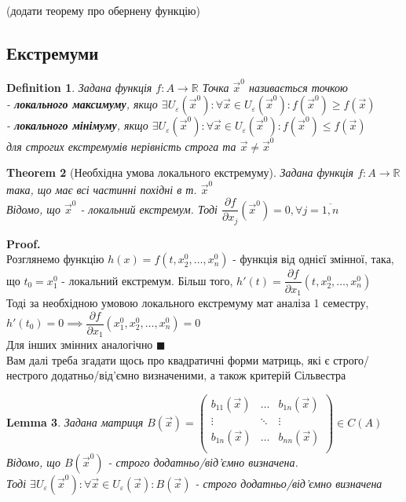 \documentclass[a4paper, 14pt]{extarticle}
\def\departial#1#2{\dfrac{\partial {#1}}{\partial {#2}}}
\def\bigline{\vspace{5mm}\\}
\theoremstyle{theoremdd}
\newtheorem{theorem}{Theorem}[subsection]
\theoremstyle{theoremdd}
\newtheorem{definition}[theorem]{Definition}
\theoremstyle{theoremdd}
\theoremstyle{theoremdd}
\theoremstyle{theoremdd}
\theoremstyle{theoremdd}
\newtheorem{lemma}[theorem]{Lemma}
\theoremstyle{theoremdd}
\newenvironment{pf}{\vspace*{-3mm} \textbf{Proof. \\}}{$\blacksquare$}
\begin{document}
(додати теорему про обернену функцію)

\subsection{Екстремуми}
\begin{definition}
Задана функція $f:A\to \mathbb{R}$
Точка $\vec{x}^0$ називається точкою\\
- \textbf{локального максимуму}, якщо $\exists U_{\varepsilon}(\vec{x}^0): \forall \vec{x} \in U_{\varepsilon}(\vec{x}^0): f(\vec{x}^0) \geq f(\vec{x})$\\
- \textbf{локального мінімуму}, якщо $\exists U_{\varepsilon}(\vec{x}^0): \forall \vec{x} \in U_{\varepsilon}(\vec{x}^0): f(\vec{x}^0) \leq f(\vec{x})$\\
для строгих екстремумів нерівність строга та $\vec{x} \neq \vec{x}^0$
\end{definition}

\begin{theorem}[Необхідна умова локального екстремуму]
Задана функція $f: A \to \mathbb{R}$ така, що має всі частинні похідні в т. $\vec{x}^0$\\
Відомо, що $\vec{x}^0$ - локальний екстремум. Тоді $\departial{f}{x_j}(\vec{x}^0) = 0, \forall j=\overline{1,n}$
\end{theorem}

\begin{pf}
Розглянемо функцію $h(x) = f(t,x_2^0,\dots,x_n^0)$ - функція від однієї змінної, така, що $t_0 = x_1^0$ - локальний екстремум. Більш того, $h'(t) = \departial{f}{x_1}(t,x_2^0,\dots,x_n^0)$\\
Тоді за необхідною умовою локального екстремуму мат аналіза 1 семестру, $h'(t_0) = 0 \implies \departial{f}{x_1}(x_1^0,x_2^0,\dots,x_n^0) = 0$\\
Для інших змінних аналогічно
\end{pf}
\bigline
Вам далі треба згадати щось про квадратичні форми матриць, які є строго/нестрого додатньо/від'ємно визначеними, а також критерій Сільвестра

\begin{lemma}
Задана матриця $B(\vec{x}) = \begin{pmatrix}
b_{11}(\vec{x}) & \dots & b_{1n}(\vec{x}) \\
\vdots & \ddots & \vdots \\
b_{1n}(\vec{x}) & \dots & b_{nn}(\vec{x}) \\
\end{pmatrix} \in C(A)$\\
Відомо, що $B(\vec{x}^0)$ - строго додатньо/від'ємно визначена. \\ Тоді $\exists U_{\varepsilon}(\vec{x}^0): \forall \vec{x} \in U_{\varepsilon}(\vec{x}): B(\vec{x})$ - строго додатньо/від'ємно визначена
\end{lemma}
\end{document}
